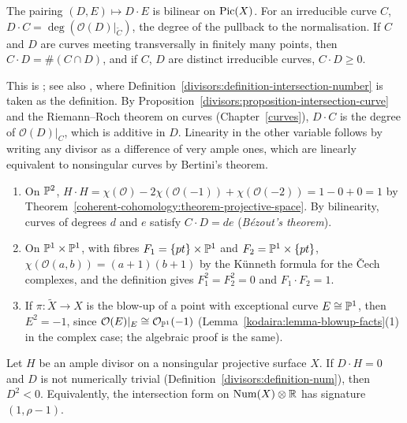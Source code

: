 \begin{theorem}\label{divisors:theorem-intersection-pairing}
The pairing $(D, E) \mapsto D \cdot E$ is bilinear on $\operatorname{Pic}(X)$. For an irreducible curve $C$, $D \cdot C = \deg(\mathcal{O}(D)|_{\tilde C})$, the degree of the pullback to the
normalisation. If $C$ and $D$ are curves meeting transversally in finitely many points, then $C \cdot D = \#(C \cap D)$, and if $C$, $D$ are distinct irreducible
curves, $C \cdot D \geq 0$.
\end{theorem}

This is \cite[Theorem V.1.1, Proposition V.1.4 and Exercise V.1.1]{hartshorne-ag}; see also \cite[Chapter I]{beauville-surfaces}, where
Definition~\ref{divisors:definition-intersection-number} is taken as the definition. By Proposition~\ref{divisors:proposition-intersection-curve} and the Riemann--Roch
theorem on curves (Chapter~\ref{curves}), $D \cdot C$ is the degree of $\mathcal{O}(D)|_C$, which is additive in $D$. Linearity in the other variable follows by writing any
divisor as a difference of very ample ones, which are linearly equivalent to nonsingular curves by Bertini's theorem.

\begin{example}\label{divisors:example-intersections}
\begin{enumerate}
\item On $\mathbb{P}^2$, $H \cdot H = \chi(\mathcal{O}) - 2\chi(\mathcal{O}(-1)) + \chi(\mathcal{O}(-2)) = 1 - 0 + 0 = 1$ by Theorem~\ref{coherent-cohomology:theorem-projective-space}. By
bilinearity, curves of degrees $d$ and $e$ satisfy $C \cdot D = de$ (\emph{B\'ezout's theorem}).
\item On $\mathbb{P}^1 \times \mathbb{P}^1$, with fibres $F_1 = \{pt\} \times \mathbb{P}^1$ and $F_2 = \mathbb{P}^1 \times \{pt\}$, $\chi(\mathcal{O}(a, b)) = (a + 1)(b + 1)$ by the K\"unneth formula for the
\v{C}ech complexes, and the definition gives $F_1^2 = F_2^2 = 0$ and $F_1 \cdot F_2 = 1$.
\item If $\pi \colon \tilde X \to X$ is the blow-up of a point with exceptional curve $E \cong \mathbb{P}^1$, then $E^2 = -1$, since $\mathcal{O}(E)|_E \cong \mathcal{O}_{\mathbb{P}^1}(-1)$
(Lemma~\ref{kodaira:lemma-blowup-facts}(1) in the complex case; the algebraic proof is the same).
\end{enumerate}
\end{example}

\begin{theorem}\label{divisors:theorem-hodge-index}
Let $H$ be an ample divisor on a nonsingular projective surface $X$. If $D \cdot H = 0$ and $D$ is not numerically trivial (Definition~\ref{divisors:definition-num}),
then $D^2 < 0$. Equivalently, the intersection form on $\mathrm{Num}(X) \otimes \mathbb{R}$ has signature $(1, \rho - 1)$.
\end{theorem}

